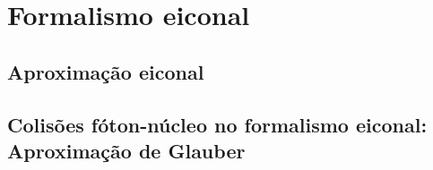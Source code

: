 \chapter{Formalismo eiconal} 
\label{cap3}
\section{Aproximação eiconal} 
\section{Colisões fóton-núcleo no formalismo eiconal: Aproximação de Glauber}